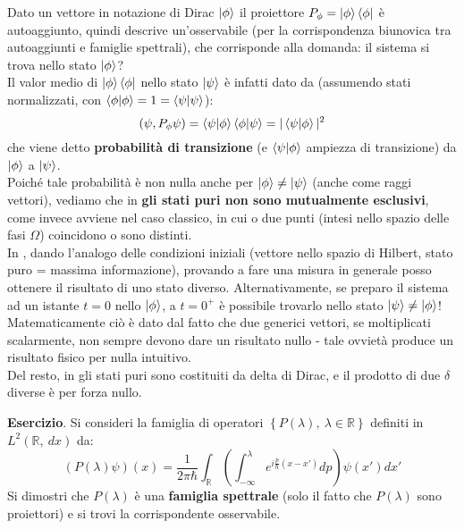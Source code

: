 \documentclass[../../FisicaTeorica.tex]{subfiles}
\begin{document}
\begin{oss}
Dato un vettore in notazione di Dirac $\ket{\phi}$ il proiettore $P_\phi =\ket{\phi}\bra{\phi}$ è autoaggiunto, quindi descrive un'osservabile (per la corrispondenza biunovica tra autoaggiunti e famiglie spettrali), che corrisponde alla domanda: il sistema si trova nello stato $\ket{\phi}$?\\
Il valor medio di $\ket{\phi}\bra{\phi}$ nello stato $\ket{\psi}$ è infatti dato da (assumendo stati normalizzati, con $\braket{\phi|\phi} = 1 = \braket{\psi|\psi}$):
\[
(\psi, P_\phi \psi) = 
\braket{\psi|\phi}\braket{\phi|\psi} = |\braket{\psi|\phi}|^2
\]
che viene detto \textbf{probabilità di transizione} (e $\braket{\psi|\phi}$ ampiezza di transizione) da $\ket{\phi}$ a $\ket{\psi}$.\\
Poiché tale probabilità è non nulla anche per $\ket{\phi}\neq\ket{\psi}$ (anche come raggi vettori), vediamo che in \MQ \textbf{gli stati puri non sono mutualmente esclusivi}, come invece avviene nel caso classico, in cui o due punti (intesi nello spazio delle fasi $\Omega$) coincidono o sono distinti.\\
In \MQ, dando l'analogo delle condizioni iniziali (vettore nello spazio di Hilbert, stato puro = massima informazione), provando a fare una misura in generale posso ottenere il risultato di uno stato diverso. Alternativamente, se preparo il sistema ad un istante $t=0$ nello $\ket{\phi}$, a $t=0^+$ è possibile trovarlo nello stato $\ket{\psi}\neq\ket{\phi}$!\\
Matematicamente ciò è dato dal fatto che due generici vettori, se moltiplicati scalarmente, non sempre devono dare un risultato nullo - tale ovvietà produce un risultato fisico per nulla intuitivo.\\
Del resto, in \MC gli stati puri sono costituiti da delta di Dirac, e il prodotto di due $\delta$ diverse è per forza nullo.
\end{oss}
\textbf{Esercizio}. Si consideri la famiglia di operatori $\left\{P\left(\lambda\right),\ \lambda\in\mathbb{R}\right\}$ definiti in $L^2\left(\mathbb{R},\ dx\right)$ da:
\[
\left(P\left(\lambda\right)\psi\right)\left(x\right)=\frac{1}{2\pi\hbar}\int_{\mathbb{R}}{\left(\int_{-\infty}^{\lambda}e^{i\frac{p}{\hbar}\left(x-x'\right)}dp\right)\psi\left(x'\right)dx'}
\]
Si dimostri che $P\left(\lambda\right)$ è una \textbf{famiglia spettrale} (solo il fatto che $P\left(\lambda\right)$ sono proiettori) e si trovi la corrispondente osservabile.\\
\end{document}
